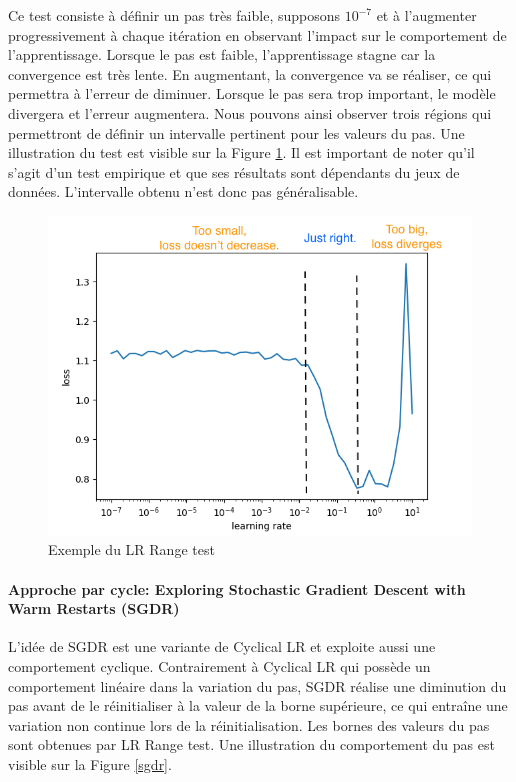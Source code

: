 \noindent Ce test consiste à définir un pas très faible, supposons $10^{-7}$ et à l'augmenter progressivement à chaque itération en observant l'impact sur le comportement de l'apprentissage. Lorsque le pas est faible, l'apprentissage stagne car la convergence est très lente. En augmentant, la convergence va se réaliser, ce qui permettra à l'erreur de diminuer. Lorsque le pas sera trop important, le modèle divergera et l'erreur augmentera. Nous pouvons ainsi observer trois régions qui permettront de définir un intervalle pertinent pour les valeurs du pas. Une illustration du test est visible sur la Figure \ref{lrrangetest}. Il est important de noter qu'il s'agit d'un test empirique et que ses résultats sont dépendants du jeux de données. L'intervalle obtenu n'est donc pas généralisable.

\begin{figure}
    \centering
    \includegraphics[scale=0.3]{./tex/fondamentaux/lrrangetest.png}
    \caption{Exemple du LR Range test}
    \label{lrrangetest}
\end{figure}

\paragraph{Approche par cycle: Exploring Stochastic Gradient Descent with Warm Restarts (SGDR)}

\noindent L'idée de SGDR\cite{sgdr} est une variante de Cyclical LR et exploite aussi une comportement cyclique. Contrairement à Cyclical LR qui possède un comportement linéaire dans la variation du pas, SGDR réalise une diminution du pas avant de le réinitialiser à la valeur de la borne supérieure, ce qui entraîne une variation non continue lors de la réinitialisation. Les bornes des valeurs du pas sont obtenues par LR Range test. Une illustration du comportement du pas est visible sur la Figure \ref{sgdr}.\\

